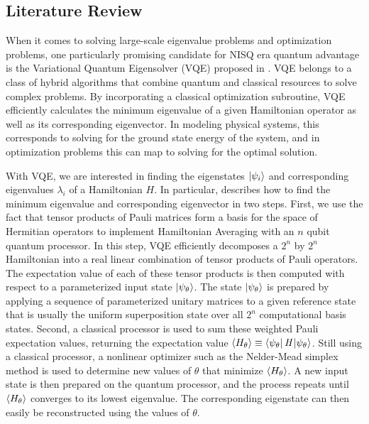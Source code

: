 \subsection{Literature Review}

When it comes to solving large-scale eigenvalue problems and optimization problems, one particularly promising candidate for NISQ era quantum advantage is the Variational Quantum Eigensolver (VQE) proposed in \cite{peruzzo_variational_2014}.  VQE belongs to a class of hybrid algorithms that combine quantum and classical resources to solve complex problems.  By incorporating a classical optimization subroutine, VQE efficiently calculates the minimum eigenvalue of a given Hamiltonian operator as well as its corresponding eigenvector.  In modeling physical systems, this corresponds to solving for the ground state energy of the system, and in optimization problems this can map to solving for the optimal solution.
    
With VQE, we are interested in finding the eigenstates $\ket{\psi_i}$ and corresponding eigenvalues $\lambda_i$ of a Hamiltonian $\textit{H}$.  In particular, \cite{peruzzo_variational_2014} describes how to find the minimum eigenvalue and corresponding eigenvector in two steps.  First, we use the fact that tensor products of Pauli matrices form a basis for the space of Hermitian operators to implement Hamiltonian Averaging with an $n$ qubit quantum processor.  In this step, VQE efficiently decomposes a $2^n$ by $2^n$ Hamiltonian into a real linear combination of tensor products of Pauli operators.  The expectation value of each of these tensor products is then computed with respect to a parameterized input state $\ket{\psi_{\theta}}$.  The state $\ket{\psi_{\theta}}$ is prepared by applying a sequence of parameterized unitary matrices to a given reference state that is usually the uniform superposition state over all $2^n$ computational basis states.  Second, a classical processor is used to sum these weighted Pauli expectation values, returning the expectation value $\expval{H_\theta}  \equiv \bra{\psi_\theta}\textit{H}\ket{\psi_\theta}$.  Still using a classical processor, a nonlinear optimizer such as the Nelder-Mead simplex method \cite{Nelder_Mead_1965} is used to determine new values of $\theta$ that minimize $\expval{H_\theta}$.  A new input state is then prepared on the quantum processor, and the process repeats until $\expval{H_\theta}$ converges to its lowest eigenvalue.  The corresponding eigenstate can then easily be reconstructed using the values of $\theta$.

